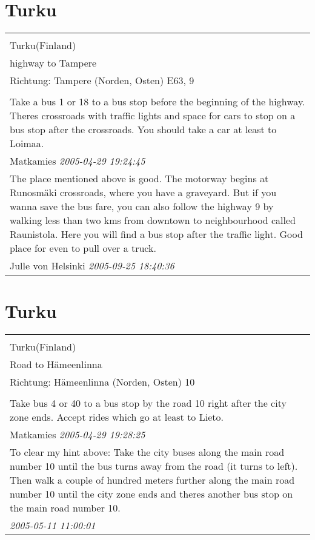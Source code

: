 \documentclass[a4paper,12pt]{article}
\begin{document}
\section{Turku}
\begin{tabular}{|p{13cm}|}
\hline\\
Turku(Finland)\\
highway to Tampere\\
Richtung: Tampere (Norden, Osten) E63, 9 \\
\hline\\
Take a bus 1 or 18 to a bus stop before the beginning of the highway. Theres crossroads with traffic lights and space for cars to stop on a bus stop after the crossroads. You should take a car at least to Loimaa. \\
Matkamies \textit{ 2005-04-29 19:24:45 }\\\hline The place mentioned above is good. The motorway begins at Runosmäki crossroads, where you have a graveyard. But if you wanna save the bus fare, you can also follow the highway 9 by walking less than two kms from downtown to neighbourhood called Raunistola. Here you will find a bus stop after the traffic light. Good place for even to pull over a truck. \\
Julle von Helsinki \textit{ 2005-09-25 18:40:36 }\\\hline
\end{tabular}


\section{Turku}
\begin{tabular}{|p{13cm}|}
\hline\\
Turku(Finland)\\
Road to Hämeenlinna\\
Richtung: Hämeenlinna (Norden, Osten) 10 \\
\hline\\
Take bus 4 or 40 to a bus stop by the road 10 right after the city zone ends. Accept rides which go at least to Lieto. \\
Matkamies \textit{ 2005-04-29 19:28:25 }\\\hline To clear my hint above: Take the city buses along the main road number 10 until the bus turns away from the road (it turns to left). Then walk a couple of hundred meters further along the main road number 10 until the city zone ends and theres another bus stop on the main road number 10. \\
\textit{ 2005-05-11 11:00:01 }\\\hline
\end{tabular}
\end{document}
